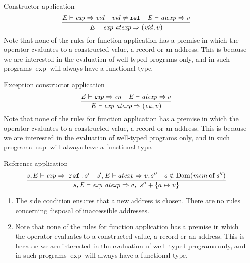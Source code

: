 \begin{inference-rule}{Constructor application}
\begin{equation}\label{rule:dynamic-core:conapp}
\vcenter{\infer{\E\ts\appexp\ra(\vid,\V)}
  {\E\ts\exp\ra\vid
    & \vid\neq\REF
    & \E\ts\atexp\ra\V}}
\end{equation}
Note that none of the rules for function application has a premise
in which the operator evaluates to a constructed value, a record or an
address. This is because we are interested in the evaluation of
well-typed programs only, and in such programs $\exp$ will always have a
functional type.
\end{inference-rule}

\begin{inference-rule}{Exception constructor application}
\begin{equation}\label{rule:dynamic-core:exception-constructor-application}
\vcenter{\infer{\E\ts\appexp\ra(\e,\V)}
  {\E\ts\exp\ra\e
    & \E\ts\atexp\ra\V}}
\end{equation}
Note that none of the rules for function application has a premise
in which the operator evaluates to a constructed value, a record or an
address. This is because we are interested in the evaluation of
well-typed programs only, and in such programs $\exp$ will always have a
functional type.
\end{inference-rule}

\begin{inference-rule}{Reference application}
\begin{equation}\label{rule:dynamic-core:refapp}
\vcenter{\infer{\s,\E\ts\appexp\ra\A,\ \s''+\{\A\mapsto\V\} }
  {\s,\E\ts\exp\ra~\ml{ref}~,\s'
    & \s',\E\ts\atexp\ra\V,\s''
    & \A\notin\Dom(\of{\mem}{\s''})}}
\end{equation}
\begin{enumerate}
\item The side condition ensures that a new address is chosen. There are no
  rules concerning disposal of inaccessible addresses.
\item Note that none of the rules for function application has a premise
in which the operator evaluates to a constructed value, a record or an
address. This is because we are interested in the evaluation of well-
typed programs only, and in such programs $\exp$ will always have a
functional type.
\end{enumerate}
\end{inference-rule}

